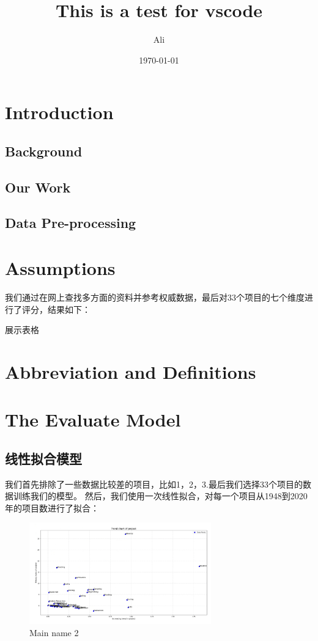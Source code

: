 \documentclass[a4paper]{article}
\title{ This is a test for vscode}
\author{ Ali}
\date{\today}
\begin{document}
    \maketitle
\begin{abstract}
    \lipsum[150]
\end{abstract}
\tableofcontents
\section{Introduction}
\subsection{Background}
\subsection{Our Work}
\subsection{Data Pre-processing}


\section{Assumptions}
我们通过在网上查找多方面的资料并参考权威数据，最后对33个项目的七个维度进行了评分，结果如下：

展示表格

\section{Abbreviation and Definitions}
\section{The Evaluate Model}
\subsection{线性拟合模型}
我们首先排除了一些数据比较差的项目，比如1，2，3.最后我们选择33个项目的数据训练我们的模型。
然后，我们使用一次线性拟合，对每一个项目从1948到2020年的项目数进行了拟合：
\begin{figure}[H] %
    \centering %
    \includegraphics[width=0.7\textwidth]{TrendChartOfProject} %
    \caption{Main name 2} %
    \label{Fig.main2} %
    \end{figure}
\end{document}

